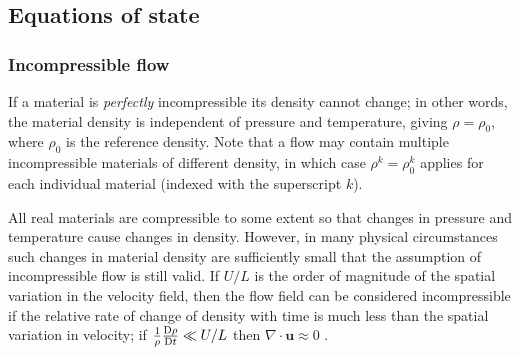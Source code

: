 \subsection{Equations of state}
\label{sect:equation_of_state}

\subsubsection{Incompressible flow}
\label{Sect:IncompressibleFlow}
If a material is \emph{perfectly} incompressible its density cannot change;
in other words, the material density is independent of pressure and
temperature, giving $\rho = \rho_0$, where $\rho_0$ is the reference
density. Note that a flow may contain multiple incompressible materials of
different density, in which case $\rho^k=\rho_0^k$ applies for each
individual material (indexed with the superscript $k$).

All real materials are compressible to some extent so that changes in
pressure and temperature cause changes in density.  However, in many
physical circumstances such changes in material density are sufficiently
small that the assumption of incompressible flow is still valid. If $U/L$ is
the order of magnitude of the spatial variation in the velocity field, then
the flow field can be considered incompressible if the relative rate of
change of density with time is much less than the spatial variation in
velocity; \ie if $\frac{1}{\rho}\frac{\mathrm{D}\rho}{\mathrm{D} t}\ll U/L$ then
$\nabla\cdot\mathbf{u}\approx 0$ \cite[][p.167]{batchelor1967}.


